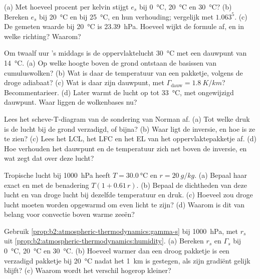 \begin{exercise}[$\star$]\label{exo:b2:atmospheric-thermodynamics:2}
(a) Met hoeveel procent per kelvin stijgt $e_s$ bij \qty{0}{\celsius}, \qty{20}{\celsius} en
\qty{30}{\celsius}? (b) Bereken $e_s$ bij \qty{20}{\celsius} en bij \qty{25}{\celsius}, en hun
verhouding; vergelijk met $1.063^5$. (c) De gemeten waarde bij \qty{20}{\celsius} is
\qty{23.39}{hPa}. Hoeveel wijkt de formule af, en in welke richting? Waarom?
\end{exercise}

\begin{exercise}[$\star$]\label{exo:b2:atmospheric-thermodynamics:3}
Om twaalf uur 's middags is de oppervlaktelucht \qty{30}{\celsius} met een dauwpunt van \qty{14}{\celsius}. (a) Op
welke hoogte boven de grond ontstaan de basissen van cumuluswolken? (b) Wat is daar de temperatuur van een pakketje,
volgens de droge adiabaat? (c) Wat is daar zijn dauwpunt, met $\Gamma_{\text{dauw}} =
\qty{1.8}{K/km}$? Becommentarieer. (d) Later warmt de lucht op tot \qty{33}{\celsius}, met ongewijzigd
dauwpunt. Waar liggen de wolkenbases nu?
\end{exercise}

\begin{exercise}[$\star$]\label{exo:b2:atmospheric-thermodynamics:4}
Lees het scheve-T-diagram van de sondering van Norman af. (a) Tot welke druk is de lucht bij de
grond verzadigd, of bijna? (b) Waar ligt de inversie, en hoe is ze te zien? (c) Lees het
LCL, het LFC en het EL van het oppervlaktepakketje af. (d) Hoe verhouden het dauwpunt en de temperatuur
zich net boven de inversie, en wat zegt dat over deze lucht?
\end{exercise}

\begin{exercise}[$\star\star$]\label{exo:b2:atmospheric-thermodynamics:5}
Tropische lucht bij \qty{1000}{hPa} heeft $T = \qty{30.0}{\celsius}$ en $r = \qty{20}{g/kg}$. (a) Bepaal
haar  exact en met de benadering $T(1 + 0.61\,r)$. (b) Bepaal de dichtheden
van deze lucht en van droge lucht bij dezelfde temperatuur en druk. (c) Hoeveel zou droge lucht
moeten worden opgewarmd om even licht te zijn? (d) Waarom is dit van belang voor convectie boven warme zeeën?
\end{exercise}

\begin{exercise}[$\star\star$]\label{exo:b2:atmospheric-thermodynamics:6}
Gebruik \cref{prop:b2:atmospheric-thermodynamics:gamma-s} bij \qty{1000}{hPa}, met $r_s$ uit
\cref{prop:b2:atmospheric-thermodynamics:humidity}. (a) Bereken $r_s$ en $\Gamma_s$ bij
\qty{0}{\celsius}, \qty{20}{\celsius} en \qty{30}{\celsius}. (b) Hoeveel warmer dan een droog
pakketje is een verzadigd pakketje bij \qty{20}{\celsius} nadat het \qty{1}{km} is gestegen, als zijn gradiënt
gelijk blijft? (c) Waarom wordt het verschil hogerop kleiner?
\end{exercise}

